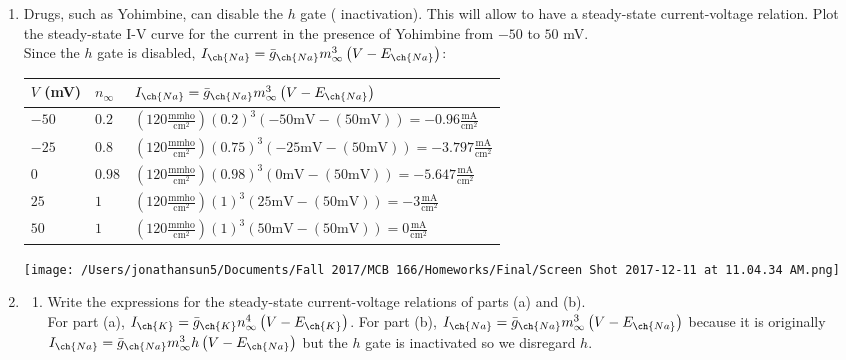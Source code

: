 \documentclass[11pt]{article}
\begin{document}
\begin{enumerate}[label=\arabic*.]
\begin{enumerate}[label=(\alph*)]
\item
Drugs, such as Yohimbine, can disable the $h$ gate ( inactivation). This will allow  to have a steady-state current-voltage relation. Plot the steady-state I-V curve for the  current in the presence of Yohimbine from $-50$ to $50$ mV.
\vspace*{1\baselineskip}
\\
Since the $h$ gate is disabled, $I_{\ch{Na}} = \bar{g}_{\ch{Na}} m_{\infty}^3 \left(V - E_{\ch{Na}}\right)$:
\begin{center}
\begin{tabular}{ l | l | l }
$V$ (mV) & $n_{\infty}$ & $I_{\ch{Na}} = \bar{g}_{\ch{Na}} m_{\infty}^3 \left(V - E_{\ch{Na}}\right)$ \\[0.125cm]
\hline
$-50$ & $0.2$ & $\left(120 \frac{\text{mmho}} {\text{cm}^2}\right) \left(0.2\right)^3 \left(-50 \text{mV} - (50 \text{mV})\right) = -0.96 \frac{\text{mA}} {\text{cm}^2}$ \\[0.25cm]
$-25$ & $0.8$ & $\left(120 \frac{\text{mmho}} {\text{cm}^2}\right) \left(0.75\right)^3 \left(-25 \text{mV} - (50 \text{mV})\right) = -3.797 \frac{\text{mA}} {\text{cm}^2}$ \\[0.25cm]
$0$ & $0.98$ & $\left(120 \frac{\text{mmho}} {\text{cm}^2}\right) \left(0.98\right)^3 \left(0 \text{mV} - (50 \text{mV})\right) = -5.647 \frac{\text{mA}} {\text{cm}^2}$ \\[0.25cm]
$25$ & $1$ & $\left(120 \frac{\text{mmho}} {\text{cm}^2}\right) \left(1\right)^3 \left(25 \text{mV} - (50 \text{mV})\right) = -3 \frac{\text{mA}} {\text{cm}^2}$ \\[0.25cm]
$50$ & $1$ & $\left(120 \frac{\text{mmho}} {\text{cm}^2}\right) \left(1\right)^3 \left(50 \text{mV} - (50 \text{mV})\right) = 0 \frac{\text{mA}} {\text{cm}^2}$ \\[0.25cm]
\end{tabular}
\end{center}
\begin{center}
\texttt{[image: /Users/jonathansun5/Documents/Fall 2017/MCB 166/Homeworks/Final/Screen Shot 2017-12-11 at 11.04.34 AM.png]}
\end{center}



\item
\begin{enumerate}[label=(\roman*)]
\item
Write the expressions for the steady-state current-voltage relations of parts (a) and (b).
\vspace*{1\baselineskip}
\\
For part (a), $I_{\ch{K}} = \bar{g}_{\ch{K}} n_{\infty}^4 \left(V - E_{\ch{K}}\right)$. For part (b), $I_{\ch{Na}} = \bar{g}_{\ch{Na}} m_{\infty}^3 \left(V - E_{\ch{Na}}\right)$ because it is originally $I_{\ch{Na}} = \bar{g}_{\ch{Na}} m_{\infty}^3 h \left(V - E_{\ch{Na}}\right)$ but the $h$ gate is inactivated so we disregard $h$.




\end{enumerate}
\end{enumerate}
\end{enumerate}
\end{document}
